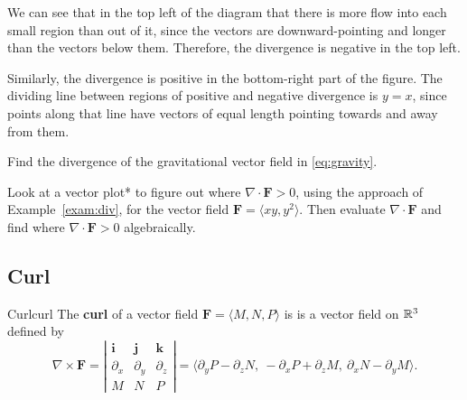 \documentclass[svgnames]{watsonbook}
\begin{document}
\begin{solution}
  We can see that in the top left of the diagram that there is more
  flow into each small region than out of it, since the vectors are
  downward-pointing and longer than the vectors below them. Therefore,
  the divergence is negative in the top left.

  Similarly, the divergence is positive in the bottom-right part of
  the figure. The dividing line between regions of positive and
  negative divergence is $y = x$, since points along that line have
  vectors of equal length pointing towards and away from them.
\end{solution}

\begin{exercise}{}{}
  Find the divergence of the gravitational vector field in
  \eqref{eq:gravity}. 
\end{exercise}

\begin{exercise}{}{}
  Look at a vector plot* to figure out where
  $\nabla \cdot \mathbf{F} > 0$, using the approach of
  Example~\ref{exam:div}, for the vector field
  $\mathbf{F} = \langle xy, y^2 \rangle$. Then evaluate
  $\nabla \cdot \mathbf{F}$ and find where
  $\nabla \cdot \mathbf{F} > 0$ algebraically.
\end{exercise}

\subsection{Curl}


\begin{defn}{Curl}{curl}
  The \textbf{curl} of a vector field $\mathbf{F} = \langle M, N, P \rangle$ is
  is a vector field on $\mathbb{R}^3$ defined by \renewcommand\arraystretch{1.4}
  \[
    \nabla \times \mathbf{F} =
    \left|
      \begin{array}{ccc}
        \mathbf{i} & \mathbf{j} & \mathbf{k} \\
        \partial_x  & \partial_y & \partial_z \\
              M         &       N       &      P
      \end{array} 
    \right| = \big\langle \partial_y P - \partial_z N, \:
    -\partial_x P  + \partial_z M, \:
    \partial_x N - \partial_y M \big\rangle. 
  \]
\end{defn}
\end{document}
